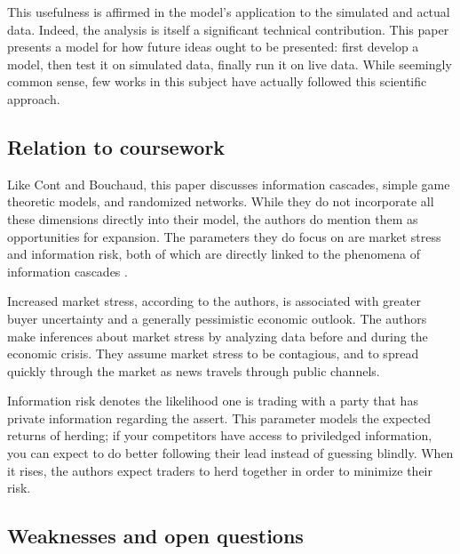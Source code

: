 \documentclass{article}
\begin{document}
  This usefulness is affirmed in the model's application to the simulated and actual data.
  Indeed, the analysis is itself a significant technical contribution.
  This paper presents a model for how future ideas ought to be presented: first develop a model, then test it on simulated data, finally run it on live data.
  While seemingly common sense, few works in this subject have actually followed this scientific approach.

\subsection{Relation to coursework}
  Like Cont and Bouchaud, this paper discusses information cascades, simple game theoretic models, and randomized networks.
  While they do not incorporate all these dimensions directly into their model, the authors do mention them as opportunities for expansion.
  The parameters they do focus on are market stress and information risk, both of which are directly linked to the phenomena of information cascades \cite{boortz}.
  
  Increased market stress, according to the authors, is associated with greater buyer uncertainty and a generally pessimistic economic outlook.
  The authors make inferences about market stress by analyzing data before and during the economic crisis. 
  They assume market stress to be contagious, and to spread quickly through the market as news travels through public channels.
  
  Information risk denotes the likelihood one is trading with a party that has private information regarding the assert.
  This parameter models the expected returns of herding; if your competitors have access to priviledged information, you can expect to do better following their lead instead of guessing blindly.
  When it rises, the authors expect traders to herd together in order to minimize their risk. 


\subsection{Weaknesses and open questions}
\end{document}
